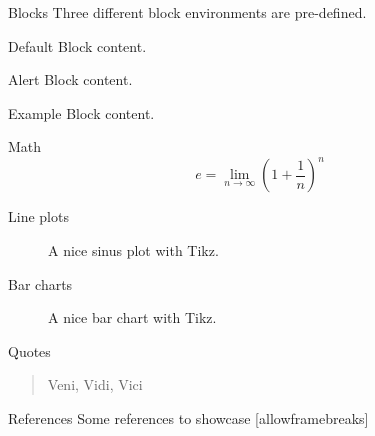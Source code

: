 		
		\begin{frame}{Blocks}
			Three different block environments are pre-defined.
			
			\begin{block}{Default}
			  Block content.
			\end{block}
			
			\begin{alertblock}{Alert}
			  Block content.
			\end{alertblock}
			
			\begin{exampleblock}{Example}
			  Block content.
			\end{exampleblock}
		\end{frame}
		
		\begin{frame}{Math}
			\begin{equation}
				e = \lim_{n\to \infty} \left(1 + \frac{1}{n}\right)^n
			\end{equation}
		\end{frame}
		
		\begin{frame}{Line plots}
			\begin{figure}
				\centering
				\caption{A nice sinus plot with Tikz.}
			\end{figure}
		\end{frame}
		
		\begin{frame}{Bar charts}
			\begin{figure}
				\centering
				\caption{A nice bar chart with Tikz.}
			\end{figure}
		\end{frame}
		
		\begin{frame}{Quotes}
			\begin{quote}
			Veni, Vidi, Vici
			\end{quote}
		\end{frame}
			
		\begin{frame}{References}
			Some references to showcase [allowframebreaks] \cite{Knuth92,ConcreteMath,Simpson,Er01,greenwade93}
		\end{frame}
	